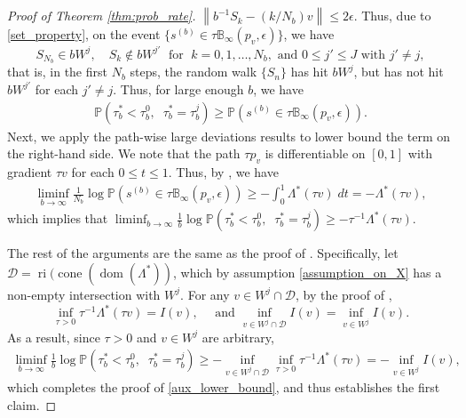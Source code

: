 \documentclass[aap,preprint]{imsart}
\newcommand{\Pro}{{\mathbb{P}}}
\theoremstyle{plain}
\theoremstyle{definition}
\begin{document}
\begin{appendix}
\begin{proof}[Proof of Theorem \ref{thm:prob_rate}]
$\left\|b^{-1} S_{k} - (k/N_b) v \right\| \leq 2 \epsilon$. Thus,
 due  to \eqref{set_property}, on the event $\{s^{(b)} \in \tau \mathbb{B}_{\infty}(p_v, \epsilon)\}$, we have
 $$
S_{N_b} \in b W^j, \quad S_{k} \not \in b W^{j'}\; \text{ for } \;k = 0,1,\ldots, N_b, \text{ and } 0 \leq j' \leq J \text{ with } j' \neq j,
$$
that is, in the first $N_b$ steps, the random walk $\{S_n\}$ has hit $bW^j$, but has not hit $b W^{j'}$ for each $j' \neq j$. Thus, for large enough $b$, we have 
\begin{align*}
\Pro(\tau^{*}_b < \tau^{0}_b,\;\; \tau_b^{*} = \tau_b^{j} )  \geq  \Pro\left( 
s^{(b)} \in \tau \mathbb{B}_{\infty}(p_v, \epsilon)
\right).
\end{align*}
Next, we apply the path-wise large deviations results to lower bound the term on the right-hand side. We note that the path $\tau p_v$ is differentiable on $[0,1]$ with gradient $\tau v$ for each $0 \leq t \leq 1$. Thus, by \citet[Theorem 2.3]{borovkov2012large}, we have
\begin{align*}
\liminf_{b \to \infty} \frac{1}{N_b} \log    \Pro\left( 
s^{(b)} \in \tau \mathbb{B}_{\infty}(p_v, \epsilon)
\right) \geq - \int_0^1 \Lambda^*(\tau v)\; dt =- \Lambda^*(\tau v),
\end{align*}
which implies that
$\liminf_{b \to \infty} \frac{1}{b} \log \Pro(\tau^{*}_b < \tau^{0}_b,\;\; \tau_b^{*} = \tau_b^{j} ) \geq -\tau^{-1} \Lambda^*(\tau v)$.

The rest of the arguments are the same as the proof of \citet[Theorem 2.1]{collamore1996}. Specifically, let $\mathcal{D} = \operatorname{ri}(\operatorname{cone}(\operatorname{dom}(\Lambda^*))$, which by assumption \eqref{assumption_on_X} has a non-empty intersection with $W^j$. For any  $v \in W^j \cap \mathcal{D}$,
by the proof of \citet[Theorem 2.1]{collamore1996},
$$
\inf_{\tau > 0} \tau^{-1} \Lambda^*(\tau v) = I(v), \quad \text{ and }
\inf_{v \in W^j \cap \mathcal{D}} I(v) = \inf_{v \in W^j} I(v).
$$
As a result, since $\tau > 0$ and $v \in W^j$ are arbitrary,
\begin{align*}
       \liminf_{b \to \infty} \frac{1}{b} \log \Pro(\tau^{*}_b < \tau^{0}_b,\;\; \tau_b^{*} = \tau_b^{j} ) \geq - \inf_{v \in W^j \cap \mathcal{D}} \inf_{\tau > 0} \tau^{-1} \Lambda^*(\tau v) = - \inf_{v \in W^j} I(v),
\end{align*}
which completes the proof of \eqref{aux_lower_bound}, and thus establishes the first claim.


\end{proof}
\end{appendix}
\end{document}
